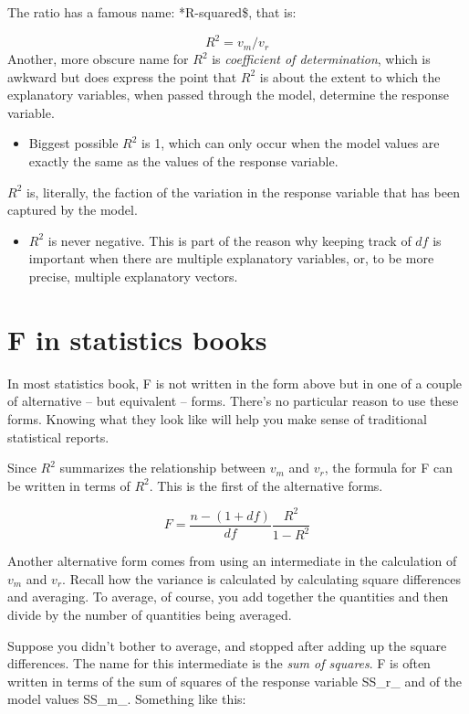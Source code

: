 \documentclass[]{tufte-book}
\providecommand{\tightlist}{%
  \setlength{\itemsep}{0pt}\setlength{\parskip}{0pt}}
\begin{document}
The ratio has a famous name: *R-squared\$, that is:

\[R^2 = v_m / v_r\]
Another, more obscure name for \(R^2\) is \emph{coefficient of determination}, which is awkward but does express the point that \(R^2\) is about the extent to which the explanatory variables, when passed through the model, determine the response variable.

\begin{itemize}
\tightlist
\item
  Biggest possible \(R^2\) is 1, which can only occur when the model values are exactly the same as the values of the response variable.
\end{itemize}

\(R^2\) is, literally, the faction of the variation in the response variable that has been captured by the model.

\begin{itemize}
\tightlist
\item
  \(R^2\) is never negative. This is part of the reason why keeping track of \(df\) is important when there are multiple explanatory variables, or, to be more precise, multiple explanatory vectors.
\end{itemize}

\hypertarget{f-in-statistics-books}{%
\section{F in statistics books}\label{f-in-statistics-books}}

In most statistics book, F is not written in the form above but in one of a couple of alternative -- but equivalent -- forms. There's no particular reason to use these forms. Knowing what they look like will help you make sense of traditional statistical reports.

Since \(R^2\) summarizes the relationship between \(v_m\) and \(v_r\), the formula for F can be written in terms of \(R^2\). This is the first of the alternative forms.

\[F = \frac{n - (1+df)}{df} \frac{R^2}{1 - R^2}\]

Another alternative form comes from using an intermediate in the calculation of \(v_m\) and \(v_r\). Recall how the variance is calculated by calculating square differences and averaging. To average, of course, you add together the quantities and then divide by the number of quantities being averaged.

Suppose you didn't bother to average, and stopped after adding up the square differences. The name for this intermediate is the \emph{sum of squares}.
F is often written in terms of the sum of squares of the response variable SS\_r\_ and of the model values SS\_m\_. Something like this:
\end{document}
